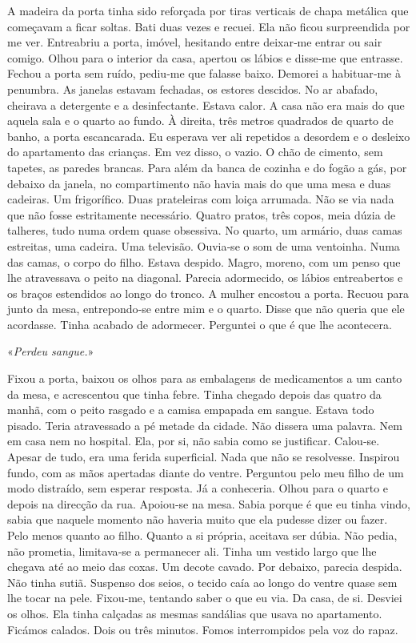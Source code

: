A madeira da porta tinha sido reforçada por tiras verticais de chapa
metálica que começavam a ficar soltas. Bati duas vezes e recuei. Ela não
ficou surpreendida por me ver. Entreabriu a porta, imóvel, hesitando
entre deixar­‑me entrar ou sair comigo. Olhou para o interior da casa,
apertou os lábios e disse­‑me que entrasse. Fechou a porta sem ruído,
pediu­‑me que falasse baixo. Demorei a habituar­‑me à penumbra. As
janelas estavam fechadas, os estores descidos. No ar abafado, cheirava a
detergente e a desinfectante. Estava calor. A casa não era mais do que
aquela sala e o quarto ao fundo. À direita, três metros quadrados de
quarto de banho, a porta escancarada. Eu esperava ver ali repetidos a
desordem e o desleixo do apartamento das crianças. Em vez disso, o
vazio. O chão de cimento, sem tapetes, as paredes brancas. Para além da
banca de cozinha e do fogão a gás, por debaixo da janela, no
compartimento não havia mais do que uma mesa e duas cadeiras. Um
frigorífico. Duas prateleiras com loiça arrumada. Não se via nada que
não fosse estritamente necessário. Quatro pratos, três copos, meia dúzia
de talheres, tudo numa ordem quase obsessiva. No quarto, um armário,
duas camas estreitas, uma cadeira. Uma televisão. Ouvia­‑se o som de uma
ventoinha. Numa das camas, o corpo do filho. Estava despido. Magro,
moreno, com um penso que lhe atravessava o peito na diagonal. Parecia
adormecido, os lábios entreabertos e os braços estendidos ao longo do
tronco. A mulher encostou a porta. Recuou para junto da mesa,
entrepondo­‑se entre mim e o quarto. Disse que não queria que ele
acordasse. Tinha acabado de adormecer. Perguntei o que é que lhe
acontecera.

«\emph{Perdeu sangue.}»

Fixou a porta, baixou os olhos para as embalagens de medicamentos a um
canto da mesa, e acrescentou que tinha febre. Tinha chegado depois das
quatro da manhã, com o peito rasgado e a camisa empapada em sangue.
Estava todo pisado. Teria atravessado a pé metade da cidade. Não dissera
uma palavra. Nem em casa nem no hospital. Ela, por si, não sabia como se
justificar. Calou­‑se. Apesar de tudo, era uma ferida superficial. Nada
que não se resolvesse. Inspirou fundo, com as mãos apertadas diante do
ventre. Perguntou pelo meu filho de um modo distraído, sem esperar
resposta. Já a conheceria. Olhou para o quarto e depois na direcção da
rua. Apoiou­‑se na mesa. Sabia porque é que eu tinha vindo, sabia que
naquele momento não haveria muito que ela pudesse dizer ou fazer. Pelo
menos quanto ao filho. Quanto a si própria, aceitava ser dúbia. Não
pedia, não prometia, limitava­‑se a permanecer ali. Tinha um vestido
largo que lhe chegava até ao meio das coxas. Um decote cavado. Por
debaixo, parecia despida. Não tinha sutiã. Suspenso dos seios, o tecido
caía ao longo do ventre quase sem lhe tocar na pele. Fixou­‑me, tentando
saber o que eu via. Da casa, de si. Desviei os olhos. Ela tinha calçadas
as mesmas sandálias que usava no apartamento. Ficámos calados. Dois ou
três minutos. Fomos interrompidos pela voz do rapaz.

